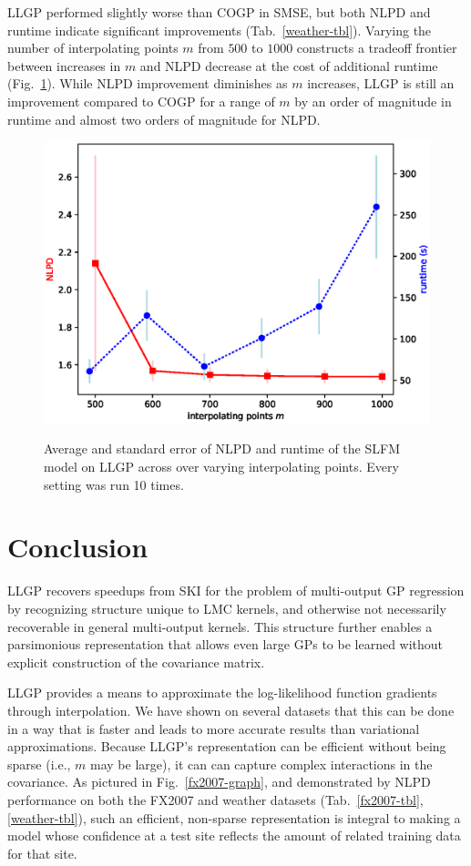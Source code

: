 \documentclass{article}
\begin{document}
LLGP performed slightly worse than COGP in SMSE, but both NLPD and runtime indicate significant improvements (Tab.~\ref{weather-tbl}). Varying the number of interpolating points $m$ from $500$ to $1000$ constructs a tradeoff frontier between increases in $m$ and NLPD decrease at the cost of additional runtime (Fig.~\ref{fig:llgpweather}). While NLPD improvement diminishes as $m$ increases, LLGP is still an improvement compared to COGP for a range of $m$ by an order of magnitude in runtime and almost two orders of magnitude for NLPD.

\begin{figure}[!h]
\centering
{\includegraphics[width=0.5\columnwidth]{m_time_nlpd.eps}}
\caption{Average and standard error of NLPD and runtime of the SLFM model on LLGP across over varying interpolating points. Every setting was run 10 times.}
\label{fig:llgpweather}
\end{figure}
\section{Conclusion}\label{conclusion}

LLGP recovers speedups from SKI \cite{kiss-gp} for the problem of multi-output GP regression by recognizing structure unique to LMC kernels, and otherwise not necessarily recoverable in general multi-output kernels. This structure further enables a parsimonious representation that allows even large GPs to be learned without explicit construction of the covariance matrix.

LLGP provides a means to approximate the log-likelihood function gradients through interpolation. We have shown on several datasets that this can be done in a way that is faster and leads to more accurate results than variational approximations. Because LLGP's representation can be efficient without being sparse (i.e., $m$ may be large), it can can capture complex interactions in the covariance. As pictured in Fig.~\ref{fx2007-graph}, and demonstrated by NLPD performance on both the FX2007 and weather datasets (Tab.~\ref{fx2007-tbl},\ref{weather-tbl}), such an efficient, non-sparse representation is integral to making a model whose confidence at a test site reflects the amount of related training data for that site.
\end{document}
